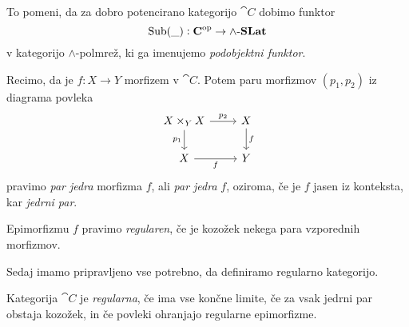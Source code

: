 \documentclass[../kategoricna_logika.tex]{subfiles}
\begin{document}
To pomeni, da za dobro potencirano kategorijo $\cat{C}$ dobimo funktor
$$\operatorname{Sub}(\_) : {\operatorname{\mathbf{C}}}^{\mathrm{op}} \to {\operatorname{\mathbf{\wedge-\mathbf{SLat}}}}$$
v kategorijo $\land$-polmrež, ki ga imenujemo \emph{podobjektni
  funktor}.
\begin{definicija}
  Recimo, da je $f : X \to Y$ morfizem v $\cat{C}$. Potem paru
  morfizmov $(p_1, p_2)$ iz diagrama povleka
  \begin{equation*}
    \begin{tikzcd}
      X \times_Y X \ar[d, "p_1"'] \ar[r, "p_2"] & X \ar[d, "f"] \\
      X \ar[r, "f"'] & Y
    \end{tikzcd}
  \end{equation*}
  pravimo \emph{par jedra} morfizma $f$, ali \emph{par jedra} $f$,
  oziroma, če je $f$ jasen iz konteksta, kar \emph{jedrni par}.
\end{definicija}
\begin{definicija}
  Epimorfizmu $f$ pravimo \emph{regularen}, če je kozožek nekega para
  vzporednih morfizmov.
\end{definicija}
Sedaj imamo pripravljeno vse potrebno, da definiramo regularno
kategorijo.
\begin{definicija}
  Kategorija $\cat{C}$ je \emph{regularna}, če ima vse končne limite,
  če za vsak jedrni par obstaja kozožek, in če povleki ohranjajo
  regularne epimorfizme.
\end{definicija}
\end{document}
